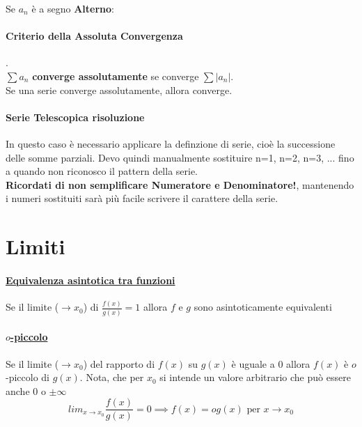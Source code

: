 \documentclass[12pt, a4paper]{article}
\begin{document}
	Se $a_n$ è a segno \textbf{Alterno}: 

	\paragraph*{Criterio della Assoluta Convergenza}.\\
	$\sum a_n$ \textbf{converge assolutamente} se converge $\sum |a_n|$.\\
	Se una serie converge assolutamente, allora converge.

	\paragraph*{Serie Telescopica risoluzione}
	In questo caso è necessario applicare la definzione di serie, cioè la successione delle somme
	parziali. Devo quindi manualmente sostituire n=1, n=2, n=3, ...
	fino a quando non riconosco il pattern della serie.
	\\ \textbf{Ricordati di non semplificare Numeratore e Denominatore!},
	mantenendo i numeri sostituiti sarà più facile scrivere il carattere della serie.
	\section*{Limiti}



	\paragraph*{\underline{Equivalenza asintotica tra funzioni}} Se il limite ($\to x_0$) di $\frac{f(x)}{g(x)} = 1$ allora $f$ e $g$ sono asintoticamente equivalenti

	\paragraph*{\underline{$o$-piccolo}} Se il limite ($\to x_0$) del rapporto di $f(x)$ su $g(x)$ è uguale a $0$ allora $f(x)$ è $o$-piccolo di $g(x)$.
	Nota, che per $x_0$ si intende un valore arbitrario che può essere anche 0 o $\pm \infty$
	$$lim_{x\to x_0} \frac{f(x)}{g(x)} = 0 \implies f(x) = o g(x)\text{ per } x\to x_0 $$
\end{document}
